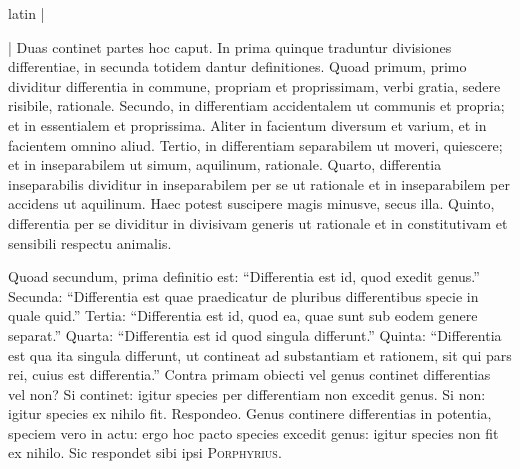 \begin{otherlanguage*}{latin}
\pstart
 \textnormal{|}  
\pend

        \pstart
        \pend
      
\pstart
\noindent%
 \textnormal{|} Duas continet partes hoc caput. In prima quinque traduntur divisiones differentiae, in secunda totidem dantur definitiones. Quoad primum, primo dividitur differentia in commune, propriam et proprissimam, verbi gratia, sedere risibile, rationale. Secundo, in differentiam accidentalem ut communis et propria; et in essentialem et proprissima. Aliter in facientum diversum et varium, et in facientem omnino aliud. Tertio, in differentiam separabilem ut moveri, quiescere; et in inseparabilem ut simum, aquilinum, rationale. Quarto, differentia inseparabilis dividitur in inseparabilem per se ut rationale et in inseparabilem per accidens ut aquilinum. Haec potest suscipere magis minusve, secus illa. Quinto, differentia per se dividitur in divisivam generis ut rationale et in constitutivam et sensibili respectu animalis. 
\pend

\pstart
 Quoad secundum, prima definitio est: \enquote{Differentia est id, quod exedit genus.} Secunda: \enquote{Differentia est quae praedicatur de pluribus differentibus specie in quale quid.} Tertia: \enquote{Differentia est id, quod ea, quae sunt sub eodem genere separat.} Quarta: \enquote{Differentia est id quod singula differunt.} Quinta: \enquote{Differentia est qua ita singula differunt, ut contineat ad substantiam et rationem, sit qui pars rei, cuius est differentia.} Contra primam obiecti vel genus continet differentias vel non? Si continet: igitur species per differentiam non excedit genus. Si non: igitur species ex nihilo fit. Respondeo. Genus continere differentias in potentia, speciem vero in actu: ergo hoc pacto species excedit genus: igitur species non fit ex nihilo. Sic respondet sibi ipsi \textsc{Porphyrius}. 
\pend

        \pstart
        \pend
      

\end{otherlanguage*}
